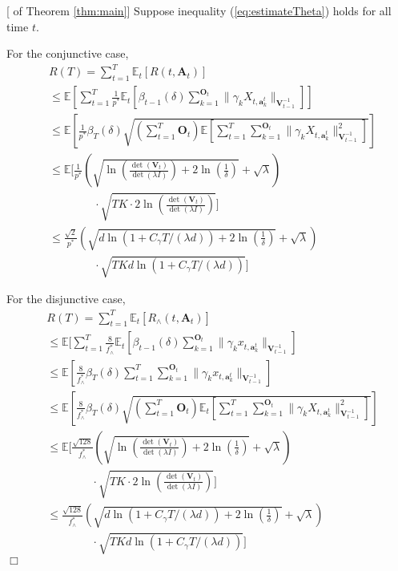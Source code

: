 \documentclass{article}
\newcommand{\EE}{\mathbb{E}}
\newcommand{\bA}{\mathbf{A}}
\newcommand{\ba}{\mathbf{a}}
\newcommand{\bO}{\mathbf{O}}
\newcommand{\bV}{\mathbf{V}}
\newcommand{\norm}[1]{\| #1 \|}
\newenvironment{proof}{\noindent {\textbf{Proof. }}}{$\Box$ \medskip}
\begin{document}
\begin{proof}[ of Theorem \ref{thm:main}]
Suppose inequality (\ref{eq:estimateTheta}) holds for all time $t$. 

For the conjunctive case,
\begin{equation}
\begin{split}
&R(T) =\sum_{t=1}^{T} \EE_{t}[R(t, \bA_t)] \\
&\leq \EE[\sum_{t=1}^{T} \frac{1}{p^*} \EE_t[\beta_{t-1}(\delta) \sum_{k=1}^{\bO_t}\norm{\gamma_k X_{t,\ba_k^t}}_{\bV_{t-1}^{-1}}]]\\
&\leq \EE[\frac{1}{p^*} \beta_T(\delta) \sqrt{(\sum_{t=1}^{T} \bO_t) \EE[\sum_{t=1}^{T} \sum_{k=1}^{\bO_t}\norm{\gamma_k X_{t,\ba_k^t}}_{\bV_{t-1}^{-1}}^2]} ]  \\
&\leq \EE[\frac{1}{p^*} (\sqrt{\ln(\frac{\det(\bV_t)}{\det(\lambda I)}) + 2\ln(\frac{1}{\delta})} + \sqrt{\lambda}) \\
&\qquad \qquad \cdot \sqrt{TK \cdot 2\ln(\frac{\det(\bV_t)}{\det(\lambda I)})} ]\\
&\leq \frac{\sqrt{2}}{p^*} (\sqrt{d\ln(1 + C_\gamma T/(\lambda d)) + 2\ln(\frac{1}{\delta})} + \sqrt{\lambda})\\
&\qquad \qquad \cdot \sqrt{TKd\ln(1 + C_\gamma T/(\lambda d))} ]
\end{split}
\end{equation}

For the disjunctive case, 
\begin{equation}
\begin{split}
&R(T) =\sum_{t=1}^{T} \EE_{t}[R_{\wedge}(t, \bA_t)] \\
&\leq \EE[\sum_{t=1}^{T} \frac{8}{f_{\wedge}^{\ast}} \EE_t[\beta_{t-1}(\delta)\sum_{k=1}^{\bO_t}\norm{\gamma_k x_{t,\ba_k^t}}_{\bV_{t-1}^{-1}}] \\
&\leq \EE[\frac{8}{f_{\wedge}^{\ast}} \beta_{T}(\delta) \sum_{t=1}^{T} \sum_{k=1}^{\bO_t}\norm{\gamma_k x_{t,\ba_k^t}}_{\bV_{t-1}^{-1}}]\\
&\leq \EE[\frac{8}{f_{\wedge}^{\ast}} \beta_{T}(\delta) \sqrt{(\sum_{t=1}^{T} \bO_t) \EE_t[\sum_{t=1}^{T} \sum_{k=1}^{\bO_t}\norm{\gamma_k X_{t,\ba_k^t}}_{\bV_{t-1}^{-1}}^2]}]\\
&\leq \EE[\frac{\sqrt{128}}{f_{\wedge}^{\ast}} (\sqrt{\ln(\frac{\det(\bV_t)}{\det(\lambda I)}) + 2\ln(\frac{1}{\delta})} + \sqrt{\lambda}) \\
&\qquad \qquad \cdot \sqrt{TK \cdot 2\ln(\frac{\det(\bV_t)}{\det(\lambda I)})} ]\\
&\leq \frac{\sqrt{128}}{f_{\wedge}^{\ast}} (\sqrt{d\ln(1 + C_\gamma T/(\lambda d)) + 2\ln(\frac{1}{\delta})} + \sqrt{\lambda})\\
&\qquad \qquad \cdot \sqrt{TKd\ln(1 + C_\gamma T/(\lambda d))} ]
\end{split}
\end{equation}
\end{proof}
	
	
	


	
\end{document}
